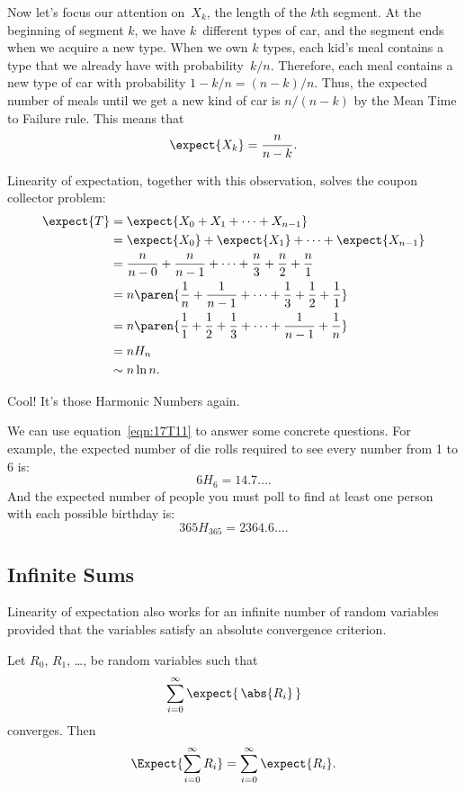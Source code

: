 Now let's focus our attention on~$X_k$, the length of the $k$th
segment.  At the beginning of segment $k$, we have $k$~different types
of car, and the segment ends when we acquire a new type.  When we own
$k$ types, each kid's meal contains a type that we already have with
probability~$k / n$.  Therefore, each meal contains a new type of car
with probability $1 - k / n = (n - k) / n$.  Thus, the expected number
of meals until we get a new kind of car is $n / (n - k)$ by the Mean
Time to Failure rule.  This means that
%
\[
    \expect{X_k} = \frac{n}{n - k}.
\]

Linearity of expectation, together with this observation, solves the
coupon collector problem:
%
\begingroup
\openup\jot
\begin{align}
\expect{T}
  & = \expect{X_0 + X_1 + \cdots + X_{n-1}} \notag\\
%
  & = \expect{X_0} + \expect{X_1} + \cdots + \expect{X_{n-1}} \notag\\
%
  & = \frac{n}{n - 0} + \frac{n}{n - 1} + \cdots + \frac{n}{3} +
    \frac{n}{2} + \frac{n}{1} \notag\\
%
  & = n \paren{\frac{1}{n} + \frac{1}{n-1} + \cdots + \frac{1}{3} +
  \frac{1}{2} + \frac{1}{1}} \notag\\
%
  &= n \paren{\frac{1}{1} + \frac{1}{2} + \frac{1}{3} + \cdots +
      \frac{1}{n-1} + \frac{1}{n}} \notag\\
%
  & = n H_n \label{eqn:17T11}\\
  & \sim n \ln n. \notag
\end{align}
\endgroup

Cool!  It's those Harmonic Numbers again.

We can use equation~\eqref{eqn:17T11} to answer some concrete questions.
For example, the expected number of die rolls required to see every
number from 1 to 6 is:
%
\[
    6 H_6 = 14.7 \dots.
\]
%
And the expected number of people you must poll to find at least one
person with each possible birthday is:
%
\[
    365 H_{365} = 2364.6\dots.
\]

\subsection{Infinite Sums}

Linearity of expectation also works for an infinite number of random
variables provided that the variables satisfy an absolute convergence
criterion.

\begin{theorem}\label{linexp}
Let $R_0$, $R_1$, \dots, be random variables such that
\[
\sum_{i = 0}^\infty \expect{\, \abs{R_i}\, }
\]
converges.  Then
\[
   \Expect{\sum_{i = 0}^\infty R_i} = \sum_{i = 0}^\infty \expect{R_i}.
\]
\end{theorem}

